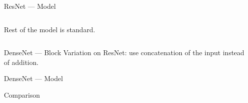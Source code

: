 \begin{frame}{ResNet --- Model}
  \begin{columns}
    \begin{column}{0.5\textwidth}
      Rest of the model is standard.
    \end{column}
    \begin{column}{0.5\textwidth}
    \end{column}
  \end{columns}
\end{frame}

\begin{frame}{DenseNet --- Block}
  Variation on ResNet: use concatenation of the input instead of addition.

\end{frame}

\begin{frame}{DenseNet --- Model}
\end{frame}

\begin{frame}{Comparison}
\end{frame}
